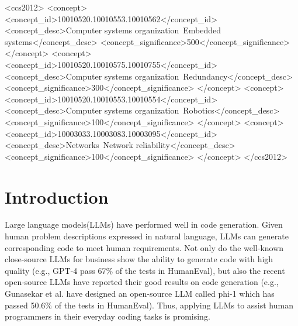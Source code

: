 \documentclass[sigconf]{acmart}
\begin{document}
\begin{CCSXML}
<ccs2012>
 <concept>
  <concept_id>10010520.10010553.10010562</concept_id>
  <concept_desc>Computer systems organization~Embedded systems</concept_desc>
  <concept_significance>500</concept_significance>
 </concept>
 <concept>
  <concept_id>10010520.10010575.10010755</concept_id>
  <concept_desc>Computer systems organization~Redundancy</concept_desc>
  <concept_significance>300</concept_significance>
 </concept>
 <concept>
  <concept_id>10010520.10010553.10010554</concept_id>
  <concept_desc>Computer systems organization~Robotics</concept_desc>
  <concept_significance>100</concept_significance>
 </concept>
 <concept>
  <concept_id>10003033.10003083.10003095</concept_id>
  <concept_desc>Networks~Network reliability</concept_desc>
  <concept_significance>100</concept_significance>
 </concept>
</ccs2012>
\end{CCSXML}



\maketitle




\section{Introduction}
Large language models(LLMs) have performed well in code generation. Given human problem descriptions expressed in natural language, LLMs can generate corresponding code to meet human requirements. Not only do the well-known close-source LLMs for business show the ability to generate code with high quality (e.g., GPT-4\cite{gpt-4} pass 67\% of the tests in HumanEval\cite{codex_humaneval}), but also the recent open-source LLMs have reported their good results on code generation (e.g., Gunasekar et al. have designed an open-source LLM called phi-1\cite{textbook_all_you_need} which has passed 50.6\% of the tests in HumanEval). Thus, applying LLMs to assist human programmers in their everyday coding tasks is promising.
\end{document}
